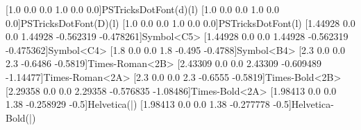 [1.0 0.0 0.0 1.0 0.0 0.0]{PSTricksDotFont}{(d)}{(l)}
[1.0 0.0 0.0 1.0 0.0 0.0]{PSTricksDotFont}{(D)}{(l)}
[1.0 0.0 0.0 1.0 0.0 0.0]{PSTricksDotFont}{(l)}
[1.44928 0.0 0.0 1.44928 -0.562319 -0.478261]{Symbol}{<C5>}
[1.44928 0.0 0.0 1.44928 -0.562319 -0.475362]{Symbol}{<C4>}
[1.8 0.0 0.0 1.8 -0.495 -0.4788]{Symbol}{<B4>}
\newpsfontdot{+}[2.3 0.0 0.0 2.3 -0.6486 -0.5819]{Times-Roman}{<2B>}
[2.43309 0.0 0.0 2.43309 -0.609489 -1.14477]{Times-Roman}{<2A>}
[2.3 0.0 0.0 2.3 -0.6555 -0.5819]{Times-Bold}{<2B>}
[2.29358 0.0 0.0 2.29358 -0.576835 -1.08486]{Times-Bold}{<2A>}
\newpsfontdot{|}[1.98413 0.0 0.0 1.38 -0.258929 -0.5]{Helvetica}{(|)}
[1.98413 0.0 0.0 1.38 -0.277778 -0.5]{Helvetica-Bold}{(|)}%

